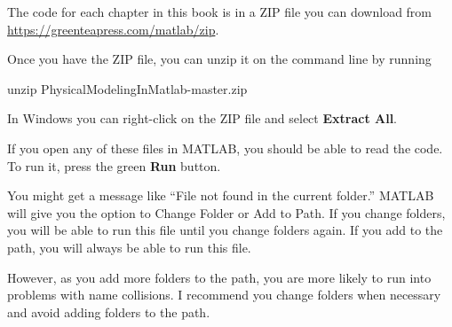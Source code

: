 
The code for each chapter in this book is in a ZIP file you can download from \url{https://greenteapress.com/matlab/zip}.

Once you have the ZIP file, you can unzip it on the command line by running

\begin{code}
unzip PhysicalModelingInMatlab-master.zip
\end{code}

In Windows you can right-click on the ZIP file and select \textbf{Extract All}.

If you open any of these files in MATLAB, you should be able to read the code.  To run it, press the green \textbf{Run} button.

You might get a message like ``File not found in the current folder.''
MATLAB will give you the option to Change Folder or Add to Path.  If you change folders, you will be able to run this file until you change folders again.  If you add to the path, you will always be able to run this file.

However, as you add more folders to the path, you are more likely to run into problems with name collisions.
I recommend you change folders when necessary and avoid adding folders to the path.


\newpage


\newpage
